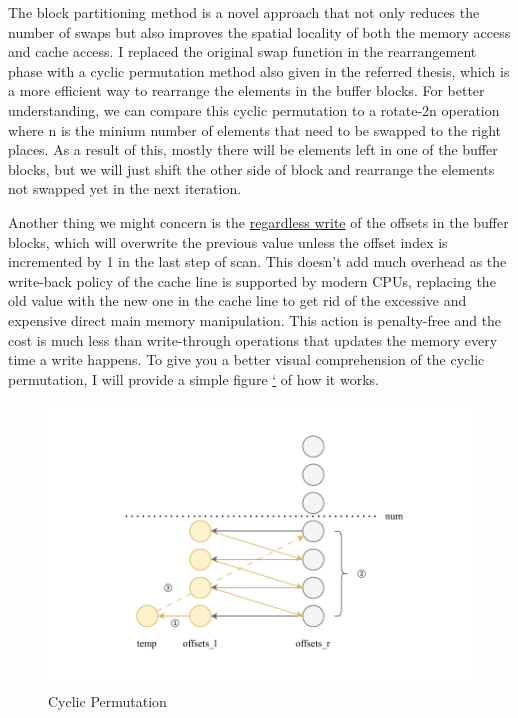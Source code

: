 \documentclass{article}
\begin{document}
The block partitioning method is a novel approach that not only reduces the number of swaps but also improves the spatial locality of both the memory access and cache access.
I replaced the original swap function in the rearrangement phase with a cyclic permutation method also given in the referred thesis, which is a more efficient way to rearrange the elements in the buffer blocks.
For better understanding, we can compare this cyclic permutation to a rotate-2n operation where n is the minium number of elements that need to be swapped to the right places.
As a result of this, mostly there will be elements left in one of the buffer blocks, but we will just shift the other side of block and rearrange the elements not swapped yet in the next iteration.

Another thing we might concern is the \hyperlink{RegardlessWrite}{regardless write} of the offsets in the buffer blocks, which will overwrite the previous value unless the offset index is incremented by 1 in the last step of scan.
This doesn't add much overhead as the write-back policy of the cache line is supported by modern CPUs, replacing the old value with the new one in the cache line to get rid of the excessive and expensive 
direct main memory manipulation. This action is penalty-free and the cost is much less than write-through operations that updates the memory every time a write happens.
To give you a better visual comprehension of the cyclic permutation, I will provide a simple figure \hyperlink{fig:cyclicpermu}{`} of how it works.

\begin{center}
\begin{figure}[H]
    \hypertarget{fig:cyclicpermu}{}
    \caption{Cyclic Permutation}
    \centering
    \includegraphics[width=1\textwidth]{cyclicpermu.drawio.pdf}
\end{figure}
\end{center}
\end{document}

